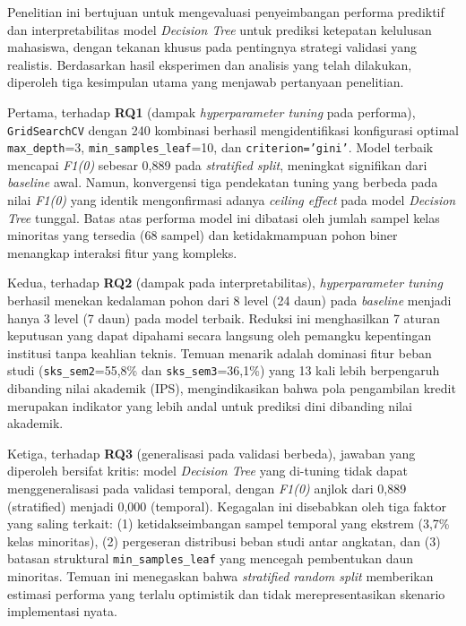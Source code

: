 \documentclass{ieeeaccess}
\begin{document}
Penelitian ini bertujuan untuk mengevaluasi penyeimbangan performa prediktif dan interpretabilitas model \emph{Decision Tree} untuk prediksi ketepatan kelulusan mahasiswa, dengan tekanan khusus pada pentingnya strategi validasi yang realistis. Berdasarkan hasil eksperimen dan analisis yang telah dilakukan, diperoleh tiga kesimpulan utama yang menjawab pertanyaan penelitian.

Pertama, terhadap \textbf{RQ1} (dampak \emph{hyperparameter tuning} pada performa), \texttt{GridSearchCV} dengan 240 kombinasi berhasil mengidentifikasi konfigurasi optimal \texttt{max\_depth}=3, \texttt{min\_samples\_leaf}=10, dan \texttt{criterion='gini'}. Model terbaik mencapai \emph{F1(0)} sebesar 0,889 pada \emph{stratified split}, meningkat signifikan dari \emph{baseline} awal. Namun, konvergensi tiga pendekatan tuning yang berbeda pada nilai \emph{F1(0)} yang identik mengonfirmasi adanya \emph{ceiling effect} pada model \emph{Decision Tree} tunggal. Batas atas performa model ini dibatasi oleh jumlah sampel kelas minoritas yang tersedia (68 sampel) dan ketidakmampuan pohon biner menangkap interaksi fitur yang kompleks.

Kedua, terhadap \textbf{RQ2} (dampak pada interpretabilitas), \emph{hyperparameter tuning} berhasil menekan kedalaman pohon dari 8 level (24 daun) pada \emph{baseline} menjadi hanya 3 level (7 daun) pada model terbaik. Reduksi ini menghasilkan 7 aturan keputusan yang dapat dipahami secara langsung oleh pemangku kepentingan institusi tanpa keahlian teknis. Temuan menarik adalah dominasi fitur beban studi (\texttt{sks\_sem2}=55,8\% dan \texttt{sks\_sem3}=36,1\%) yang 13 kali lebih berpengaruh dibanding nilai akademik (IPS), mengindikasikan bahwa pola pengambilan kredit merupakan indikator yang lebih andal untuk prediksi dini dibanding nilai akademik.

Ketiga, terhadap \textbf{RQ3} (generalisasi pada validasi berbeda), jawaban yang diperoleh bersifat kritis: model \emph{Decision Tree} yang di-tuning tidak dapat menggeneralisasi pada validasi temporal, dengan \emph{F1(0)} anjlok dari 0,889 (stratified) menjadi 0,000 (temporal). Kegagalan ini disebabkan oleh tiga faktor yang saling terkait: (1) ketidakseimbangan sampel temporal yang ekstrem (3,7\% kelas minoritas), (2) pergeseran distribusi beban studi antar angkatan, dan (3) batasan struktural \texttt{min\_samples\_leaf} yang mencegah pembentukan daun minoritas. Temuan ini menegaskan bahwa \emph{stratified random split} memberikan estimasi performa yang terlalu optimistik dan tidak merepresentasikan skenario implementasi nyata.
\end{document}
